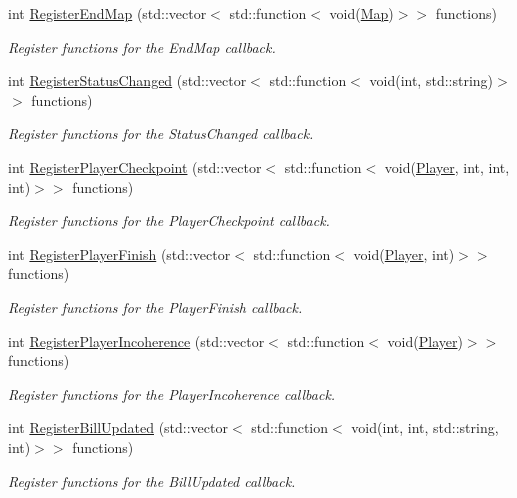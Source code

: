 \begin{DoxyCompactItemize}
int \hyperlink{classEventManager_aa8cff04bd5efe5933b99e9cd4d2862d3}{Register\-End\-Map} (std\-::vector$<$ std\-::function$<$ void(\hyperlink{structMap}{Map})$>$$>$ functions)
\begin{DoxyCompactList}\small\item\em Register functions for the End\-Map callback. \end{DoxyCompactList}\item 
int \hyperlink{classEventManager_ad84c001cc738faa396aaa5948573b682}{Register\-Status\-Changed} (std\-::vector$<$ std\-::function$<$ void(int, std\-::string)$>$$>$ functions)
\begin{DoxyCompactList}\small\item\em Register functions for the Status\-Changed callback. \end{DoxyCompactList}\item 
int \hyperlink{classEventManager_ac9a8f0e6f7c4750e476059955042ccad}{Register\-Player\-Checkpoint} (std\-::vector$<$ std\-::function$<$ void(\hyperlink{structPlayer}{Player}, int, int, int)$>$$>$ functions)
\begin{DoxyCompactList}\small\item\em Register functions for the Player\-Checkpoint callback. \end{DoxyCompactList}\item 
int \hyperlink{classEventManager_a4f23806f21b01bd408630d604f8cb6a0}{Register\-Player\-Finish} (std\-::vector$<$ std\-::function$<$ void(\hyperlink{structPlayer}{Player}, int)$>$$>$ functions)
\begin{DoxyCompactList}\small\item\em Register functions for the Player\-Finish callback. \end{DoxyCompactList}\item 
int \hyperlink{classEventManager_a05fec5b169d8bf0abd1e32908b33c074}{Register\-Player\-Incoherence} (std\-::vector$<$ std\-::function$<$ void(\hyperlink{structPlayer}{Player})$>$$>$ functions)
\begin{DoxyCompactList}\small\item\em Register functions for the Player\-Incoherence callback. \end{DoxyCompactList}\item 
int \hyperlink{classEventManager_a8ce3c162bdc0cad5ea03e9bf1233c991}{Register\-Bill\-Updated} (std\-::vector$<$ std\-::function$<$ void(int, int, std\-::string, int)$>$$>$ functions)
\begin{DoxyCompactList}\small\item\em Register functions for the Bill\-Updated callback. \end{DoxyCompactList}\item 

\end{DoxyCompactItemize}
